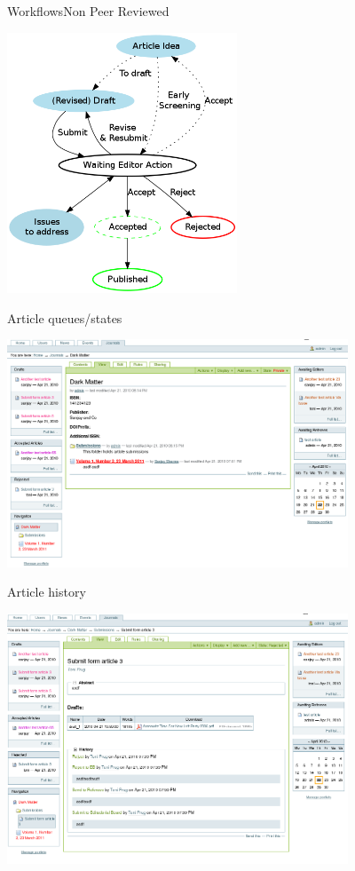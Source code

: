\begin{frame}{Workflows}{Non Peer Reviewed}
\begin{center}
\includegraphics[width=2.7in]{WorkflowNonPR.png}
\end{center}
\end{frame}

\begin{frame}{Article queues/states}
\begin{center}
\includegraphics[width=4in]{5-darkmatter-ArticleQueues.png}
\end{center}
\end{frame} 

\begin{frame}{Article history}
\begin{center}
\includegraphics[width=4in]{6-darkmatter-ArticleHistory.png}
\end{center}
\end{frame} 



